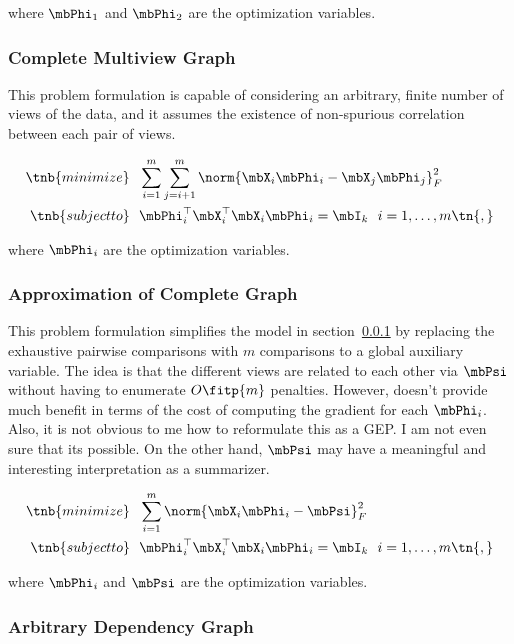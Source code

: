 \documentclass{article}
\begin{document}
	\noindent where $\mbPhi_1$ and $\mbPhi_2$ are the optimization variables.
	
	\subsubsection{Complete Multiview Graph} \label{subsubsec:cgraph}
	
	This problem formulation is capable of considering an arbitrary, finite number of views of the data, and it assumes the existence of non-spurious correlation between each pair of views.
	
	\begin{align*}
		\tnb{minimize}&\ \ \sum_{i=1}^m \sum_{j=i+1}^m \norm{\mbX_i \mbPhi_i - \mbX_j \mbPhi_j}_F^2\\
		\tnb{subject to}&\ \  \mbPhi_i^{\top}\mbX_i^{\top}\mbX_i\mbPhi_i = \mbI_k\ \ i=1,\ldots,m \tn{,}
	\end{align*}
	
	\noindent where $\mbPhi_i$ are the optimization variables.
	
	\subsubsection{Approximation of Complete Graph} \label{subsubsec:approxfcgraph}
	
	This problem formulation simplifies the model in section~\ref{subsubsec:cgraph} by replacing the exhaustive pairwise comparisons with $m$ comparisons to a global auxiliary variable. The idea is that the different views are related to each other via $\mbPsi$ without having to enumerate $O\fitp{m}$ penalties. However, doesn't provide much benefit in terms of the cost of computing the gradient for each $\mbPhi_i$. Also, it is not obvious to me how to reformulate this as a GEP. I am not even sure that its possible. On the other hand, $\mbPsi$ may have a meaningful and interesting interpretation as a summarizer.
	
	\begin{align*}
		\tnb{minimize}&\ \ \sum_{i=1}^m \norm{\mbX_i \mbPhi_i - \mbPsi}_F^2\\
		\tnb{subject to}&\ \  \mbPhi_i^{\top}\mbX_i^{\top}\mbX_i\mbPhi_i = \mbI_k\ \ i=1,\ldots,m \tn{,}
	\end{align*}
	
	\noindent where $\mbPhi_i$ and $\mbPsi$ are the optimization variables.

	\subsubsection{Arbitrary Dependency Graph} \label{subsubsec:arbdepgraph}
	
\end{document}
